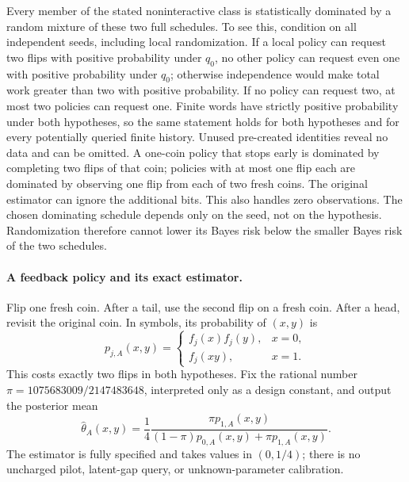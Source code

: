 Every member of the stated noninteractive class is statistically dominated
by a random mixture of these two full schedules. To see this, condition
on all independent seeds, including local randomization. If a local policy
can request two flips with positive probability under $q_0$, no other
policy can request even one with positive probability under $q_0$;
otherwise independence would make total work greater than two with positive
probability. If no policy can request two, at most two policies can request
one. Finite words have strictly positive probability under both hypotheses,
so the same statement holds for both hypotheses and for every potentially
queried finite history. Unused pre-created identities reveal no data and
can be omitted. A one-coin policy that stops early is dominated by completing
two flips of that coin; policies with at most one flip each are dominated
by observing one flip from each of two fresh coins. The original estimator
can ignore the additional bits. This also handles zero observations.
The chosen dominating schedule depends only on the seed, not on the
hypothesis. Randomization therefore cannot lower its Bayes risk below
the smaller Bayes risk of the two schedules.

\paragraph{A feedback policy and its exact estimator.}
Flip one fresh coin. After a tail, use the second flip on a fresh coin.
After a head, revisit the original coin. In symbols, its probability of
$(x,y)$ is
\[
 p_{j,A}(x,y)=
 \begin{cases}f_j(x)f_j(y),&x=0,\\ f_j(xy),&x=1.\end{cases}
\]
This costs exactly two flips in both hypotheses. Fix the rational number
$\pi=1075683009/2147483648$, interpreted only as a design constant, and
output the posterior mean
\[
 \widehat\theta_A(x,y)
 =\frac14\frac{\pi p_{1,A}(x,y)}
 {(1-\pi)p_{0,A}(x,y)+\pi p_{1,A}(x,y)}.
\]
The estimator is fully specified and takes values in $(0,1/4)$; there is
no uncharged pilot, latent-gap query, or unknown-parameter calibration.

